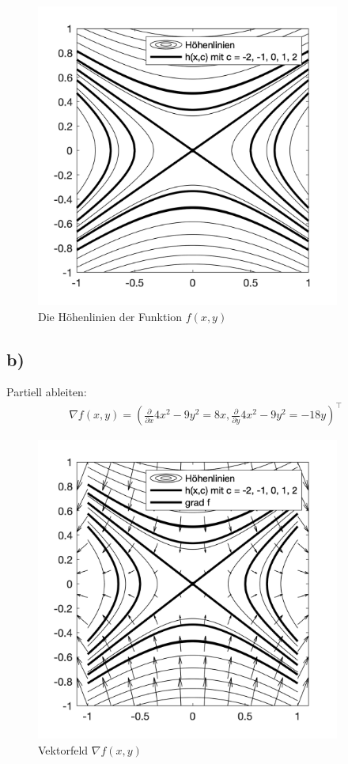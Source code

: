 \documentclass[11pt,a4paper]{article}
\newcommand{\1}    	{\mathbbm{1}}
\begin{document}
	\begin{figure}[!h]
  	\centering
 	\includegraphics[width=10cm]{Blatt01_4a.png}
  	\caption{Die Höhenlinien der Funktion \(f(x,y)\) }
	\end{figure}
	
	\newpage
	\subsection*{b)}
	
	Partiell ableiten:
	\begin{align*}
		\nabla f(x,y) = \left( \frac{\partial}{\partial x} 4x^2 - 9y^2 = 8x, \frac{\partial}{\partial y}  4x^2 - 9y^2 = -18y \right)^\top
	\end{align*}
	
	\begin{figure}[!h]
  	\centering
 	\includegraphics[width=10cm]{Blatt01_4b.png}
  	\caption{Vektorfeld \(\nabla f(x,y)\) }
	\end{figure}
	
	
\end{document}
